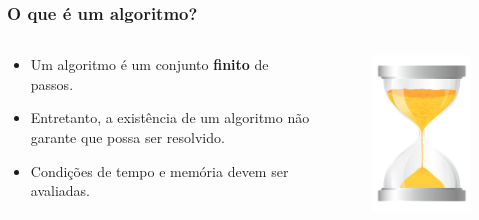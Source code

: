\documentclass[10pt]{beamer}
\newcommand{\duascolunas}[2]{
  \begin{columns}
    \begin{column}{0.72\textwidth}
      #1
    \end{column}
    \begin{column}{0.28\textwidth}
		#2
	\end{column}
  \end{columns}
}
\begin{document}
\begin{frame}[t]
    \frametitle{O que é um algoritmo?}
    \duascolunas{\begin{itemize}
            \item Um algoritmo é um conjunto \textbf{finito} de passos.
            \item Entretanto, a existência de um algoritmo não garante que possa ser resolvido.
            \item  Condições de tempo e memória devem ser avaliadas.
        \end{itemize}}{\begin{figure}[h]
            \centering
            \includegraphics[width=1\textwidth]{Ampulheta}
        \end{figure}}
\end{frame}
\end{document}
